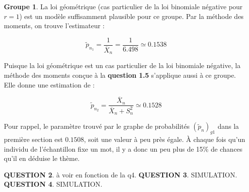 \documentclass[a4paper,11pt]{article}
\newcommand{\quest}[1]{\small\textbf{#1}\normalsize}
\theoremstyle{nonumberplain}
\theoremstyle{nonumberplain}
\theoremstyle{nonumberplain}
\theoremstyle{nonumberplain}
\begin{document}
      \bigskip
      \textbf{Groupe 1}. \newline
      La loi géométrique (cas particulier de la loi binomiale négative pour $r = 1$)
      est un modèle suffisamment plausible pour ce groupe. Par la méthode des moments, on
      trouve l'estimateur :

      \[
            \tilde{p}_{n_1} = \frac{1}{\overline{X}_n} = \frac{1}{6.498} \simeq 0.1538
      \]

      Puisque la loi géométrique est un cas particulier de la loi binomiale
      négative, la méthode des moments conçue à la \textbf{question 1.5} s'applique aussi
      à ce groupe. Elle donne une estimation de :

      \[
            \tilde{p}_{n_2} = \frac{\overline{X}_n}{\overline{X}_n + S_n^{2}} \simeq 0.1528
      \]

      \medskip
      Pour rappel, le paramètre trouvé par le graphe de probabilités
      $(\tilde{p}_n)_{g1}$ dans la première section est $0.1508$, soit une valeur à
      peu près égale. \`{A} chaque fois qu'un individu de l'échantillon fixe
      un mot, il y a donc un peu plus de 15\% de chances qu'il en déduise le thème.

      \vspace{8cm}
      \quest{QUESTION 2}. à voir en fonction de la q4.
      \quest{QUESTION 3}. SIMULATION.
      \quest{QUESTION 4}. SIMULATION.
\end{document}
